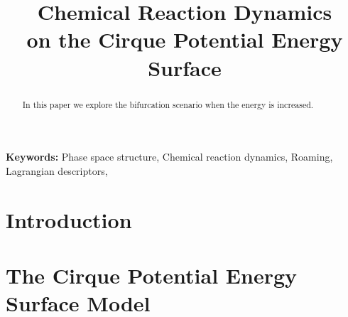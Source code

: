 \documentclass[10pt,aps,onecolumn,superscriptaddress]{revtex4-2}
\begin{document}
\title{Chemical Reaction Dynamics \\ on the Cirque Potential Energy Surface}

%
%
%


\begin{abstract}

In this paper we explore the bifurcation scenario when the energy is increased.


\end{abstract}

\maketitle

\noindent\textbf{Keywords:} Phase space structure, Chemical reaction dynamics, Roaming, Lagrangian descriptors, 

\section{Introduction}

\section{The Cirque Potential Energy Surface Model}
\end{document}
